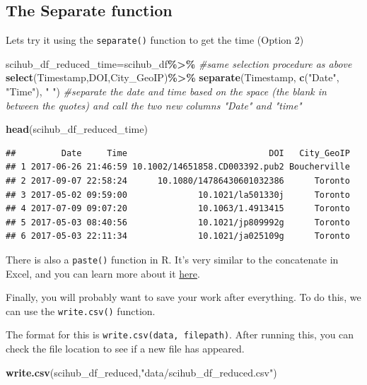 \documentclass[
]{article}
\newenvironment{Shaded}{\begin{snugshade}}{\end{snugshade}}
\newcommand{\CommentTok}[1]{\textcolor[rgb]{0.56,0.35,0.01}{\textit{#1}}}
\newcommand{\FunctionTok}[1]{\textcolor[rgb]{0.13,0.29,0.53}{\textbf{#1}}}
\newcommand{\NormalTok}[1]{#1}
\newcommand{\OtherTok}[1]{\textcolor[rgb]{0.56,0.35,0.01}{#1}}
\newcommand{\SpecialCharTok}[1]{\textcolor[rgb]{0.81,0.36,0.00}{\textbf{#1}}}
\newcommand{\StringTok}[1]{\textcolor[rgb]{0.31,0.60,0.02}{#1}}
\begin{document}
\subsection{The Separate function}\label{the-separate-function}

Lets try it using the \texttt{separate()} function to get the time
(Option 2)

\begin{Shaded}
\begin{Highlighting}[]
\NormalTok{scihub\_df\_reduced\_time}\OtherTok{=}\NormalTok{scihub\_df}\SpecialCharTok{\%\textgreater{}\%} \CommentTok{\#same selection procedure as above }
  \FunctionTok{select}\NormalTok{(Timestamp,DOI,City\_GeoIP)}\SpecialCharTok{\%\textgreater{}\%}
  \FunctionTok{separate}\NormalTok{(Timestamp, }\FunctionTok{c}\NormalTok{(}\StringTok{"Date"}\NormalTok{, }\StringTok{"Time"}\NormalTok{), }\StringTok{" "}\NormalTok{) }\CommentTok{\#separate the date and time based on the space (the blank in between the quotes) and call the two new columns "Date" and "time" }

\FunctionTok{head}\NormalTok{(scihub\_df\_reduced\_time)}
\end{Highlighting}
\end{Shaded}

\begin{verbatim}
##         Date     Time                            DOI   City_GeoIP
## 1 2017-06-26 21:46:59 10.1002/14651858.CD003392.pub2 Boucherville
## 2 2017-09-07 22:58:24      10.1080/14786430601032386      Toronto
## 3 2017-05-02 09:59:00              10.1021/la501330j      Toronto
## 4 2017-07-09 09:07:20              10.1063/1.4913415      Toronto
## 5 2017-05-03 08:40:56              10.1021/jp809992g      Toronto
## 6 2017-05-03 22:11:34              10.1021/ja025109g      Toronto
\end{verbatim}

There is also a \texttt{paste()} function in R. It's very similar to the
concatenate in Excel, and you can learn more about it
\href{https://www.digitalocean.com/community/tutorials/paste-in-r}{here}.

Finally, you will probably want to save your work after everything. To
do this, we can use the \texttt{write.csv()} function.

The format for this is \texttt{write.csv(data,\ filepath)}. After
running this, you can check the file location to see if a new file has
appeared.

\begin{Shaded}
\begin{Highlighting}[]
\FunctionTok{write.csv}\NormalTok{(scihub\_df\_reduced,}\StringTok{"data/scihub\_df\_reduced.csv"}\NormalTok{)}
\end{Highlighting}
\end{Shaded}
\end{document}
